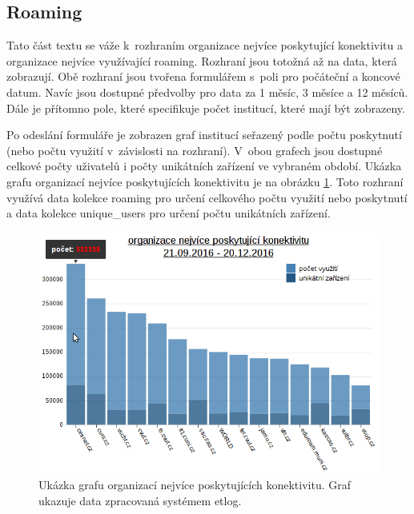 \documentclass[thesis=M,czech]{FITthesis}[2012/06/26]
\begin{document}
    \subsection{Roaming}

      Tato část textu se váže k~rozhraním organizace nejvíce poskytující konektivitu a organizace nejvíce využívající roaming.
      Rozhraní jsou totožná až na data, která zobrazují.
      Obě rozhraní jsou tvořena formulářem s~poli pro počáteční a koncové datum.
      Navíc jsou dostupné předvolby pro data za 1 měsíc, 3 měsíce a 12 měsíců.
      Dále je přítomno pole, které specifikuje počet institucí, které mají být zobrazeny.
      
      Po odeslání formuláře je zobrazen
      graf institucí seřazený podle počtu poskytnutí (nebo počtu využití v~závislosti na rozhraní).
      V~obou grafech jsou dostupné celkové počty uživatelů i počty unikátních zařízení ve vybraném období.
      Ukázka grafu organizací nejvíce poskytujících konektivitu je na obrázku \ref{fig:roaming_graph}.
      Toto rozhraní využívá data kolekce roaming pro určení celkového počtu využití nebo poskytnutí
      a data kolekce unique\_users pro určení počtu unikátních zařízení.
      
      \begin{figure}
        \centering
          \includegraphics[scale=0.45]{roaming_graph.png}
        \caption[Ukázka grafu organizací nejvíce poskytujících konektivitu]{Ukázka grafu organizací nejvíce poskytujících konektivitu.
        Graf ukazuje data zpracovaná systémem etlog.}
        \label{fig:roaming_graph}
      \end{figure}
\end{document}
